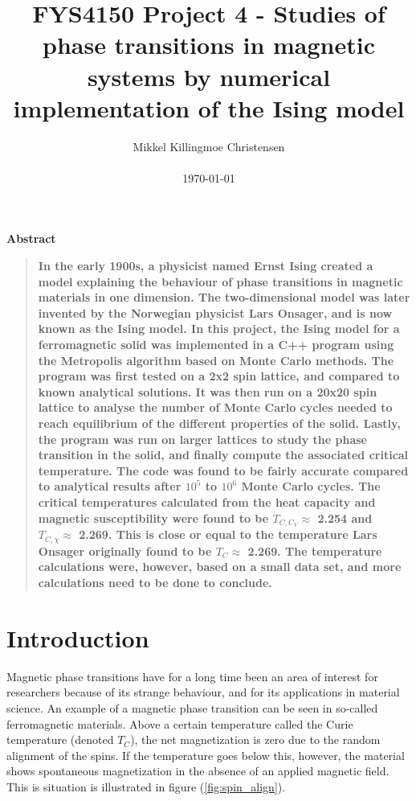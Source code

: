 \documentclass[10pt,a4paper,titlepage]{article}
\title{FYS4150 Project 4 - Studies of phase transitions in magnetic systems by numerical implementation of the Ising model}
\author
{Mikkel Killingmoe Christensen\\
\\
\normalsize{\today}
}
\date{}
\newenvironment{sciabstract}{%
\begin{quote} \bf}
{\end{quote}}
\begin{document}
 


\maketitle 


\tableofcontents
\clearpage


\begin{center}
{\large \textbf{Abstract}}
\end{center}
\begin{sciabstract}
In the early 1900s, a physicist named Ernst Ising created a model explaining the behaviour of phase transitions in magnetic materials in one dimension. The two-dimensional model was later invented by the Norwegian physicist Lars Onsager, and is now known as the Ising model. In this project, the Ising model for a ferromagnetic solid was implemented in a C++ program using the Metropolis algorithm based on Monte Carlo methods. The program was first tested on a 2x2 spin lattice, and compared to known analytical solutions. It was then run on a 20x20 spin lattice to analyse the number of Monte Carlo cycles needed to reach equilibrium of the different properties of the solid. Lastly, the program was run on larger lattices to study the phase transition in the solid, and finally compute the associated critical temperature. The code was found to be fairly accurate compared to analytical results after $10^5$ to $10^6$ Monte Carlo cycles. The critical temperatures calculated from the heat capacity and magnetic susceptibility were found to be $T_{C,C_{V}} \approx$ 2.254 and $T_{C, \chi} \approx$ 2.269. This is close or equal to the temperature Lars Onsager originally found to be $T_C \approx$ 2.269. The temperature calculations were, however, based on a small data set, and more calculations need to be done to conclude. 
\end{sciabstract}




\section{Introduction}
Magnetic phase transitions have for a long time been an area of interest for researchers because of its strange behaviour, and for its applications in material science. An example of a magnetic phase transition can be seen in so-called ferromagnetic materials. Above a certain temperature called the Curie temperature (denoted $T_C$), the net magnetization is zero due to the random alignment of the spins. If the temperature goes below this, however, the material shows spontaneous magnetization in the absence of an applied magnetic field. This is situation is illustrated in figure (\ref{fig:spin_align}).  
\end{document}
